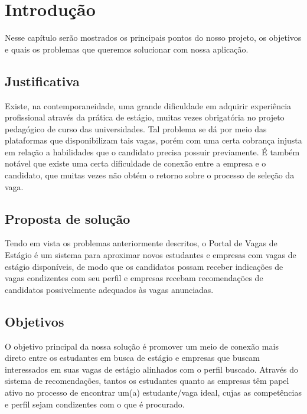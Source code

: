 
\chapter[Introdução]{Introdução}

Nesse capítulo serão mostrados os principais pontos do nosso projeto, os objetivos e quais os problemas que queremos solucionar com nossa aplicação.

\section{Justificativa}
Existe, na contemporaneidade, uma grande dificuldade em adquirir experiência profissional através da prática de estágio, muitas vezes obrigatória no projeto pedagógico de curso das universidades. Tal problema se dá por meio das plataformas que disponibilizam tais vagas, porém com uma certa cobrança injusta em relação a habilidades que o candidato precisa possuir previamente. É também notável que existe uma certa dificuldade de conexão entre a empresa e o candidato, que muitas vezes não obtém o retorno sobre o processo de seleção da vaga.

\section{Proposta de solução}
Tendo em vista os problemas anteriormente descritos, o Portal de Vagas de Estágio é um sistema para aproximar novos estudantes e empresas com vagas de estágio disponíveis, de modo que os candidatos possam receber indicações de vagas condizentes com seu perfil e empresas recebam recomendações de candidatos possivelmente adequados às vagas anunciadas.

\section{Objetivos}
O objetivo principal da nossa solução é promover um meio de conexão mais direto entre os estudantes em busca de estágio e empresas que buscam interessados em suas vagas de estágio alinhados com o perfil buscado. Através do sistema de recomendações, tantos os estudantes quanto as empresas têm papel ativo no processo de encontrar um(a) estudante/vaga ideal, cujas as competências e perfil sejam condizentes com o que é procurado.

